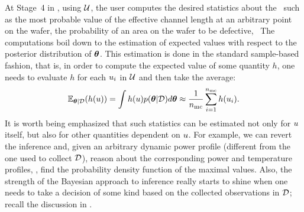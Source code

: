 At Stage~4 in , using $\mathcal{U}$, the user computes the desired statistics about the \qoi\ such as the most probable value of the effective channel length at an arbitrary point on the wafer, the probability of an area on the wafer to be defective, \etc\ The computations boil down to the estimation of expected values with respect to the posterior distribution of ${\boldsymbol\theta}$. This estimation is done in the standard sample-based fashion, that is, in order to compute the expected value of some quantity $h$, one needs to evaluate $h$ for each $u_i$ in $\mathcal{U}$ and then take the average:
\[
  \E_{\vparam | \Data}(h(\u)) = \int h(\u) \f{\vparam | \Data} d\vparam \approx \frac{1}{\nsamples} \sum_{i = 1}^\nsamples h(\u_i).
\]
It is worth being emphasized that such statistics can be estimated not only for $u$ itself, but also for other quantities dependent on $u$.
For example, we can revert the inference and, given an arbitrary dynamic power profile (different from the one used to collect $\mathcal{D}$), reason about the corresponding power and temperature profiles, \eg, find the probability density function of the maximal values.
Also, the strength of the Bayesian approach to inference really starts to shine when one needs to take a decision of some kind based on the collected observations in $\mathcal{D}$; recall the discussion in .
